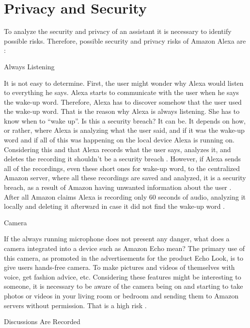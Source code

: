 \documentclass[
  digital, %
  oneside, %
  table,   %
  lof,     %
  lot,     %
]{fithesis3}
\begin{document}
\section{Privacy and Security}
To analyze the security and privacy of an assistant it is necessary to identify possible risks. Therefore, possible security and privacy risks of Amazon Alexa are \parencite{alexa_risks}:
\begin{compactitem}
  \item Always Listening
  
It is not easy to determine. First, the user might wonder why Alexa would listen to everything he says. Alexa starts to communicate with the user when he says the wake-up word. Therefore, Alexa has to discover somehow that the user used the wake-up word. That is the reason why Alexa is always listening. She has to know when to ``wake up''. Is this a security breach? It can be. It depends on how, or rather, where Alexa is analyzing what the user said, and if it was the wake-up word and if all of this was happening on the local device Alexa is running on. Considering this and that Alexa records what the user says, analyzes it, and deletes the recording it shouldn't be a security breach \parencite{alexa_risks}. However, if Alexa sends all of the recordings, even these short ones for wake-up word, to the centralized Amazon server, where all these recordings are saved and analyzed, it is a security breach, as a result of Amazon having unwanted information about the user \parencite{alexa_listening} \parencite{alexa_listening2}. After all Amazon claims Alexa is recording only 60 seconds of audio, analyzing it locally and deleting it afterward in case it did not find the wake-up word \parencite{alexa_palmer}.

  \item Camera
  
If the always running microphone does not present any danger, what does a camera integrated into a device such as Amazon Echo mean? The primary use of this camera, as promoted in the advertisements for the product Echo Look, is to give users hands-free camera. To make pictures and videos of themselves with voice, get fashion advice, etc. Considering these features might be interesting to someone, it is necessary to be aware of the camera being on and starting to take photos or videos in your living room or bedroom and sending them to Amazon servers without permission. That is a high risk \parencite{alexa_camera}.

  \item Discussions Are Recorded
  

\end{compactitem}
\end{document}
